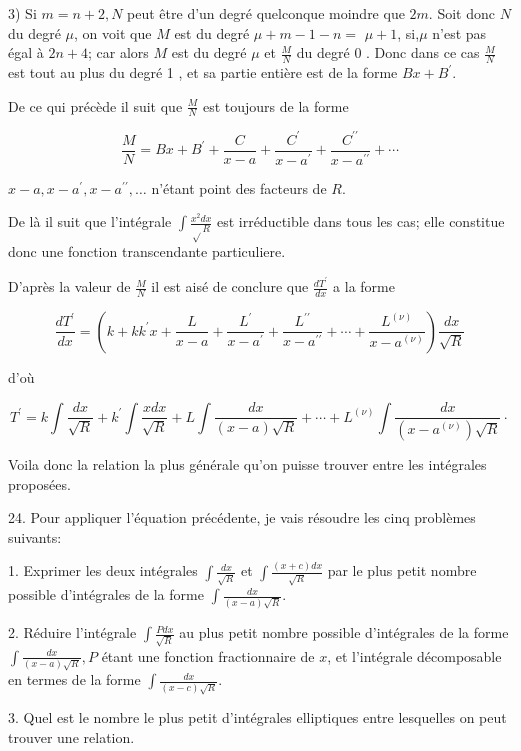 \documentclass{article}
\begin{document}
3) Si \(m=n+2, N\) peut être d'un degré quelconque moindre que \(2 m\). Soit donc \(N\) du degré \(\mu\), on voit que \(M\) est du degré \(\mu+m-1-n=\) \(\mu+1\), si,\(\mu\) n'est pas égal à \(2 n+4\); car alors \(M\) est du degré \(\mu\) et \(\frac{M}{N}\) du degré 0 . Donc dans ce cas \(\frac{M}{N}\) est tout au plus du degré 1 , et sa partie entière est de la forme \(B x+B^{\prime}\).

De ce qui précède il suit que \(\frac{M}{N}\) est toujours de la forme

\[
\frac{M}{N}=B x+B^{\prime}+\frac{C}{x-a}+\frac{C^{\prime}}{x-a^{\prime}}+\frac{C^{\prime \prime}}{x-a^{\prime \prime}}+\cdots
\]

\(x-a, x-a^{\prime}, x-a^{\prime \prime}, \ldots\) n'étant point des facteurs de \(R\).

De là il suit que l'intégrale \(\int \frac{x^{2} d x}{\sqrt{ } R}\) est irréductible dans tous les cas; elle constitue donc une fonction transcendante particuliere.

D'après la valeur de \(\frac{M}{N}\) il est aisé de conclure que \(\frac{d T^{\prime}}{d x}\) a la forme

\[
\frac{d T^{\prime}}{d x}=\left(k+k k^{\prime} x+\frac{L}{x-a}+\frac{L^{\prime}}{x-a^{\prime}}+\frac{L^{\prime \prime}}{x-a^{\prime \prime}}+\cdots+\frac{L^{(\nu)}}{x-a^{(\nu)}}\right) \frac{d x}{\sqrt{R}}
\]

d'où

\[
T^{\prime}=k \int \frac{d x}{\sqrt{R}}+k^{\prime} \int \frac{x d x}{\sqrt{R}}+L \int \frac{d x}{(x-a) \sqrt{R}}+\cdots+L^{(\nu)} \int \frac{d x}{\left(x-a^{(\nu)}\right) \sqrt{R}} \cdot
\]

Voila donc la relation la plus générale qu'on puisse trouver entre les intégrales proposées.

24. Pour appliquer l'équation précédente, je vais résoudre les cinq problèmes suivants:

1. Exprimer les deux intégrales \(\int \frac{d x}{\sqrt{R}}\) et \(\int \frac{(x+c) d x}{\sqrt{R}}\) par le plus petit nombre possible d'intégrales de la forme \(\int \frac{d x}{(x-a) \sqrt{R}}\).

2. Réduire l'intégrale \(\int \frac{P d x}{\sqrt{R}}\) au plus petit nombre possible d'intégrales de la forme \(\int \frac{d x}{(x-a) \sqrt{R}}, P\) étant une fonction fractionnaire de \(x\), et l'intégrale décomposable en termes de la forme \(\int \frac{d x}{(x-c) \sqrt{R}}\).

3. Quel est le nombre le plus petit d'intégrales elliptiques entre lesquelles on peut trouver une relation.
\end{document}
